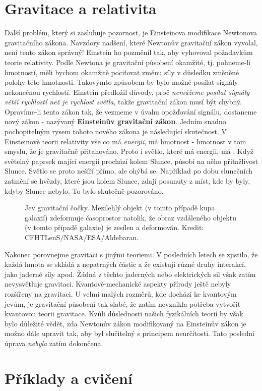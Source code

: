   \section{Gravitace a relativita}
    Další problém, který si zasluhuje pozornost, je Einsteinova modifikace Newtonova gravitačního 
    zákona. Navzdory nadšení, které Newtonův gravitační zákon vyvolal, není tento zákon správný! 
    Einstein ho pozměnil tak, aby vyhovoval požadavkům teorie relativity. Podle Newtona je 
    gravitační působení okamžité, tj. pohneme-li hmotností, měli bychom okamžitě pociťovat změnu 
    síly v důsledku změněné polohy této hmotnosti. Takovýmto způsobem by bylo možné posílat signály 
    nekonečnou rychlostí. Einstein předložil důvody, proč \emph{nemůžeme posílat signály větší 
    rychlostí než je rychlost světla}, takže gravitační zákon musí být chybný. Opravíme-li tento 
    zákon tak, že vezmeme v úvahu opožďování signálu, dostaneme nový zákon - nazývaný 
    \textbf{Einsteinův gravitační zákon}. Jedním snadno pochopitelným rysem tohoto nového zákona je 
    následující skutečnost. V Einsteinově teorii relativity vše co má \emph{energii}, má hmotnost - 
    hmotnost v tom smyslu, že je gravitačně přitahováno. Proto i světlo, které má energii, má 
    . Když světelný paprsek mající energii prochází kolem Slunce, působí na něho 
    přitažlivost Slunce. Světlo se proto nešíří přímo, ale ohýbá se. Například po dobu slunečních 
    zatmění se hvězdy, které jsou kolem Slunce, zdají posunuty z míst, kde by byly, kdyby Slunce 
    nebylo. To bylo skutečně pozorováno.

    \begin{figure}[ht!]  %
      \centering
      \caption{ Jev gravitační čočky. Mezilehlý objekt (v tomto případě kupa galaxií) zdeformuje
                časoprostor natolik, že obraz vzdáleného objektu (v tomto případě galaxie) je
                zesílen a deformován. Kredit: CFHTLenS/NASA/ESA/Aldebaran.}
      \label{fyz:fig888}
    \end{figure}
    
    Nakonec porovnejme gravitaci s jinými teoriemi. V posledních letech se zjistilo, že každá hmota 
    se skládá z nepatrných částic a že existují různé druhy interakcí, jako jaderné síly apod. 
    Žádná z těchto jaderných nebo elektrických sil však zatím nevysvětluje gravitaci.     
    Kvantově-mechanické aspekty přírody ještě nebyly rozšířeny na gravitaci. U velmi malých 
    rozměrů, kde dochází ke kvantovým jevům, je gravitační působení tak slabé, že zatím nevznikla 
    potřeba vytvořit kvantovou teorii gravitace. Kvůli důslednosti našich fyzikálních teorií by 
    však bylo důležité vědět, zda Newtonův zákon modifikovaný na Einsteinův zákon je možno dále 
    upravit tak, aby byl slučitelný s principem neurčitosti. Tato poslední úprava \emph{nebyla} 
    zatím dokončena.
  
  \section{Příklady a cvičení}

